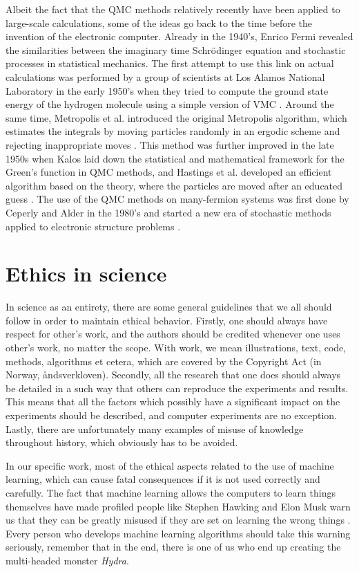 Albeit the fact that the QMC methods relatively recently have been applied to large-scale calculations, some of the ideas go back to the time before the invention of the electronic computer. Already in the 1940's, Enrico Fermi revealed the similarities between the imaginary time Schrödinger equation and stochastic processes in statistical mechanics. The first attempt to use this link on actual calculations was performed by a group of scientists at Los Alamos National Laboratory in the early 1950's when they tried to compute the ground state energy of the hydrogen molecule using a simple version of VMC \cite{bajdich_electronic_2010}. Around the same time, Metropolis et al. introduced the original Metropolis algorithm, which estimates the integrals by moving particles randomly in an ergodic scheme and rejecting inappropriate moves \cite{metropolis_monte_1949}. This method was further improved in the late 1950s when Kalos laid down the statistical and mathematical framework for the Green's function in QMC methods, and Hastings et al. developed an efficient algorithm based on the theory, where the particles are moved after an educated guess \cite{hastings_monte_1970}. The use of the QMC methods on many-fermion systems was first done by Ceperly and Alder in the 1980's and started a new era of stochastic methods applied to electronic structure problems \cite{ceperley_quantum_1986}. 

\section{Ethics in science}
In science as an entirety, there are some general guidelines that we all should follow in order to maintain ethical behavior. Firstly, one should always have respect for other's work, and the authors should be credited whenever one uses other's work, no matter the scope. With work, we mean illustrations, text, code, methods, algorithms et cetera, which are covered by the Copyright Act (in Norway, åndsverkloven). Secondly, all the research that one does should always be detailed in a such way that others can reproduce the experiments and results. This means that all the factors which possibly have a significant impact on the experiments should be described, and computer experiments are no exception. Lastly, there are unfortunately many examples of misuse of knowledge throughout history, which obviously has to be avoided.

In our specific work, most of the ethical aspects related to the use of machine learning, which can cause fatal consequences if it is not used correctly and carefully. The fact that machine learning allows the computers to learn things themselves have made profiled people like Stephen Hawking and Elon Musk warn us that they can be greatly misused if they are set on learning the wrong things \cite{cellan-jones_hawking:_2014, vance_elon_2015}. Every person who develops machine learning algorithms should take this warning seriously, remember that in the end, there is one of us who end up creating the multi-headed monster \textit{Hydra}.

